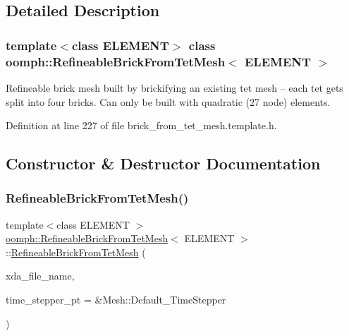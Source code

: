 \subsection{Detailed Description}
\subsubsection*{template$<$class E\+L\+E\+M\+E\+NT$>$\newline
class oomph\+::\+Refineable\+Brick\+From\+Tet\+Mesh$<$ E\+L\+E\+M\+E\+N\+T $>$}

Refineable brick mesh built by brickifying an existing tet mesh -- each tet gets split into four bricks. Can only be built with quadratic (27 node) elements. 

Definition at line 227 of file brick\+\_\+from\+\_\+tet\+\_\+mesh.\+template.\+h.



\subsection{Constructor \& Destructor Documentation}
\mbox{\label{classoomph_1_1RefineableBrickFromTetMesh_ad46067054ab0f2d078171060956821b4}} 
\subsubsection{\texorpdfstring{Refineable\+Brick\+From\+Tet\+Mesh()}{RefineableBrickFromTetMesh()}\hspace{0.1cm}{\footnotesize\ttfamily [1/2]}}
{\footnotesize\ttfamily template$<$class E\+L\+E\+M\+E\+NT $>$ \\
\hyperlink{classoomph_1_1RefineableBrickFromTetMesh}{oomph\+::\+Refineable\+Brick\+From\+Tet\+Mesh}$<$ E\+L\+E\+M\+E\+NT $>$\+::\hyperlink{classoomph_1_1RefineableBrickFromTetMesh}{Refineable\+Brick\+From\+Tet\+Mesh} (\begin{DoxyParamCaption}\item[{const std\+::string}]{xda\+\_\+file\+\_\+name,  }\item[{Time\+Stepper $\ast$}]{time\+\_\+stepper\+\_\+pt = {\ttfamily \&Mesh\+:\+:Default\+\_\+TimeStepper} }\end{DoxyParamCaption})\hspace{0.3cm}{\ttfamily [inline]}}



